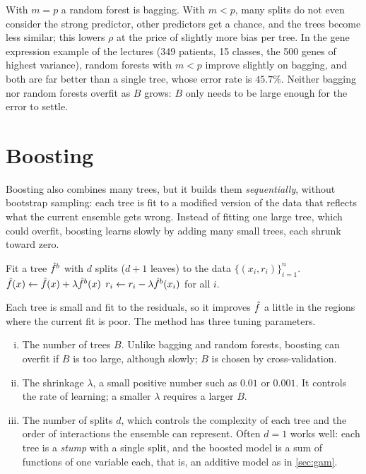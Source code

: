 With $m=p$ a random forest is bagging. With $m<p$, many splits do not even consider the strong predictor, other predictors get a chance, and the trees become less similar; this lowers $\rho$ at the price of slightly more bias per tree. In the gene expression example of the lectures (349 patients, 15 classes, the 500 genes of highest variance), random forests with $m<p$ improve slightly on bagging, and both are far better than a single tree, whose error rate is $45.7\%$. Neither bagging nor random forests overfit as $B$ grows: $B$ only needs to be large enough for the error to settle.

\section{Boosting}\label{sec:boosting}

Boosting also combines many trees, but it builds them \emph{sequentially}, without bootstrap sampling: each tree is fit to a modified version of the data that reflects what the current ensemble gets wrong. Instead of fitting one large tree, which could overfit, boosting learns slowly by adding many small trees, each shrunk toward zero.

\begin{algorithm}[H]
\caption{Boosting for Regression Trees}\label{alg:boosting}
\begin{algorithmic}[1]
  \State Fit a tree $\hat f^b$ with $d$ splits ($d+1$ leaves) to the data $\{(x_i,r_i)\}_{i=1}^n$.
  \State $\hat f(x)\gets\hat f(x)+\lambda\hat f^b(x)$ 
  \State $r_i\gets r_i-\lambda\hat f^b(x_i)$ for all $i$. 
\EndFor
{}
\end{algorithmic}
\end{algorithm}

Each tree is small and fit to the residuals, so it improves $\hat f$ a little in the regions where the current fit is poor. The method has three tuning parameters.
\begin{enumerate}[(i)]
  \item The number of trees $B$. Unlike bagging and random forests, boosting can overfit if $B$ is too large, although slowly; $B$ is chosen by cross-validation.
  \item The shrinkage $\lambda$, a small positive number such as $0.01$ or $0.001$. It controls the rate of learning; a smaller $\lambda$ requires a larger $B$.
  \item The number of splits $d$, which controls the complexity of each tree and the order of interactions the ensemble can represent. Often $d=1$ works well: each tree is a \emph{stump} with a single split, and the boosted model is a sum of functions of one variable each, that is, an additive model as in \cref{sec:gam}.
\end{enumerate}

